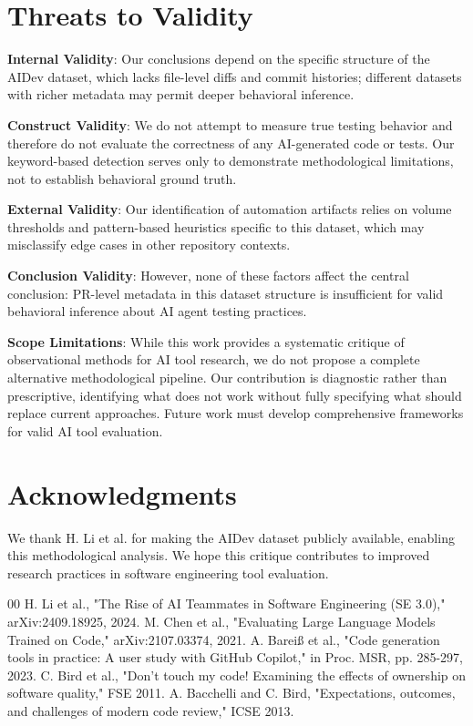 \documentclass[conference]{IEEEtran}
\begin{document}
\section*{Threats to Validity}

\textbf{Internal Validity}: Our conclusions depend on the specific structure of the AIDev dataset, which lacks file-level diffs and commit histories; different datasets with richer metadata may permit deeper behavioral inference.

\textbf{Construct Validity}: We do not attempt to measure true testing behavior and therefore do not evaluate the correctness of any AI-generated code or tests. Our keyword-based detection serves only to demonstrate methodological limitations, not to establish behavioral ground truth.

\textbf{External Validity}: Our identification of automation artifacts relies on volume thresholds and pattern-based heuristics specific to this dataset, which may misclassify edge cases in other repository contexts.

\textbf{Conclusion Validity}: However, none of these factors affect the central conclusion: PR-level metadata in this dataset structure is insufficient for valid behavioral inference about AI agent testing practices.

\textbf{Scope Limitations}: While this work provides a systematic critique of observational methods for AI tool research, we do not propose a complete alternative methodological pipeline. Our contribution is diagnostic rather than prescriptive, identifying what does not work without fully specifying what should replace current approaches. Future work must develop comprehensive frameworks for valid AI tool evaluation.

\section*{Acknowledgments}

We thank H. Li et al. for making the AIDev dataset publicly available, enabling this methodological analysis. We hope this critique contributes to improved research practices in software engineering tool evaluation.

\balance
\begin{thebibliography}{00}
 H. Li et al., "The Rise of AI Teammates in Software Engineering (SE 3.0)," arXiv:2409.18925, 2024.
 M. Chen et al., "Evaluating Large Language Models Trained on Code," arXiv:2107.03374, 2021.
 A. Bareiß et al., "Code generation tools in practice: A user study with GitHub Copilot," in Proc. MSR, pp. 285-297, 2023.
 C. Bird et al., "Don't touch my code! Examining the effects of ownership on software quality," FSE 2011.
 A. Bacchelli and C. Bird, "Expectations, outcomes, and challenges of modern code review," ICSE 2013.
\end{thebibliography}
\end{document}
